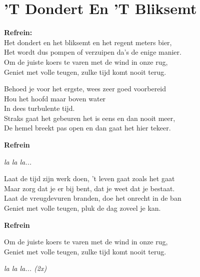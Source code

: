 \section{'T Dondert En 'T Bliksemt}

\textbf{Refrein:}\\
Het dondert en het bliksemt en het regent meters bier,\\
Het wordt dus pompen of verzuipen da's de enige manier.\\
Om de juiste koers te varen met de wind in onze rug,\\
Geniet met volle teugen, zulke tijd komt nooit terug.

Behoed je voor het ergste, wees zeer goed voorbereid\\
Hou het hoofd maar boven water\\
In dees turbulente tijd.\\
Straks gaat het gebeuren het is eens en dan nooit meer,\\
De hemel breekt pas open en dan gaat het hier tekeer.

\textbf{Refrein}

\textit{la la la...}

Laat de tijd zijn werk doen, 't leven gaat zoals het gaat\\
Maar zorg dat je er bij bent, dat je weet dat je bestaat.\\
Laat de vreugdevuren branden, doe het onrecht in de ban\\
Geniet met volle teugen, pluk de dag zoveel je kan.

\textbf{Refrein}

Om de juiste koers te varen met de wind in onze rug,\\
Geniet met volle teugen, zulke tijd komt nooit terug.

\textit{la la la... (2x)}
